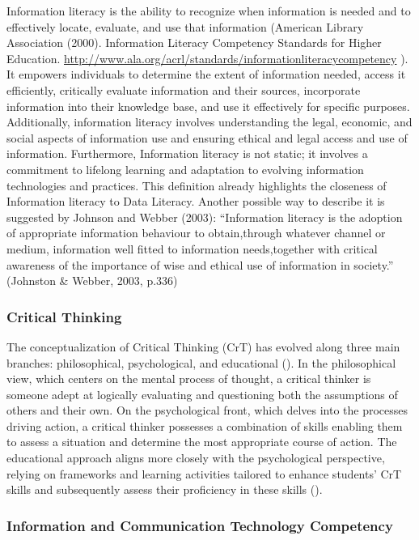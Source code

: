 \documentclass[
  12pt,
  a4paper,
  twoside]{article}
\begin{document}
Information literacy is the ability to recognize when information is needed and to effectively locate, evaluate, and use that information (American Library Association (2000). Information Literacy Competency Standards for Higher Education. \url{http://www.ala.org/acrl/standards/informationliteracycompetency} ). It empowers individuals to determine the extent of information needed, access it efficiently, critically evaluate information and their sources, incorporate information into their knowledge base, and use it effectively for specific purposes. Additionally, information literacy involves understanding the legal, economic, and social aspects of information use and ensuring ethical and legal access and use of information.
Furthermore, Information literacy is not static; it involves a commitment to lifelong learning and adaptation to evolving information technologies and practices. This definition already highlights the closeness of Information literacy to Data Literacy.
Another possible way to describe it is suggested by Johnson and Webber (2003):
``Information literacy is the adoption of appropriate information behaviour to obtain,through whatever channel or medium, information well fitted to information needs,together with critical awareness of the importance of wise and ethical use of information in society.'' (Johnston \& Webber, 2003, p.336)

\subsubsection{Critical Thinking}\label{critical-thinking}

The conceptualization of Critical Thinking (CrT) has evolved along three main branches: philosophical, psychological, and educational (). In the philosophical view, which centers on the mental process of thought, a critical thinker is someone adept at logically evaluating and questioning both the assumptions of others and their own. On the psychological front, which delves into the processes driving action, a critical thinker possesses a combination of skills enabling them to assess a situation and determine the most appropriate course of action. The educational approach aligns more closely with the psychological perspective, relying on frameworks and learning activities tailored to enhance students' CrT skills and subsequently assess their proficiency in these skills ().

\subsubsection{Information and Communication Technology Competency}\label{information-and-communication-technology-competency}
\end{document}
